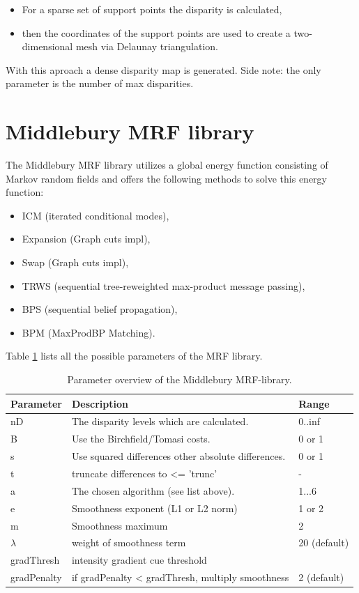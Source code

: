 \begin{itemize}
  \item For a sparse set of support points the disparity is calculated,
  \item then the coordinates of the support points are used to create a two-dimensional mesh via Delaunay triangulation.
\end{itemize}

\noindent With this aproach a dense disparity map is generated. Side note: the only parameter is the number of max disparities.

\section{Middlebury MRF library}

The Middlebury MRF library\citep{scharstein2014high} utilizes a global energy function consisting of Markov random fields and offers the following methods to solve this energy function:

\begin{itemize}
  \item ICM (iterated conditional modes),
  \item Expansion (Graph cuts impl),
  \item Swap (Graph cuts impl),
  \item TRWS (sequential tree-reweighted max-product message passing),
  \item BPS (sequential belief propagation),
  \item BPM (MaxProdBP Matching).
\end{itemize}

\noindent Table \ref{tab:parameter-middlebury-library} lists all the possible parameters of the MRF library.

\begin{table}[h!]
\centering
\begin{tabular}{l|l|l}
  \hline
  \textbf{Parameter} & \textbf{Description} & \textbf{Range} \\ \hline \hline
  nD & The disparity levels which are calculated. & 0..inf \\
  B & Use the Birchfield/Tomasi costs. & 0 or 1 \\
  s & Use squared differences other absolute differences. & 0 or 1 \\
  t & truncate differences to <= 'trunc' & - \\
  a & The chosen algorithm (see list above). & 1...6 \\
  e & Smoothness exponent (L1 or L2 norm) & 1 or 2 \\
  m & Smoothness maximum & 2 \\
  $\lambda$ & weight of smoothness term & 20 (default) \\
  gradThresh & intensity gradient cue threshold & \\
  gradPenalty & if gradPenalty < gradThresh, multiply smoothness & 2 (default) \\ \hline
\end{tabular}
\caption{Parameter overview of the Middlebury MRF-library.}
\label{tab:parameter-middlebury-library}
\end{table}

